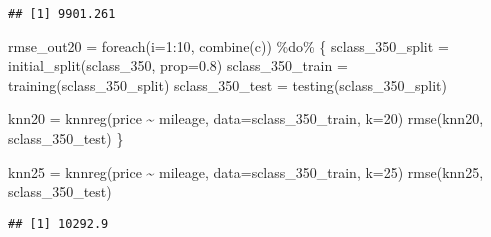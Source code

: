 \documentclass[
]{article}
\newenvironment{Shaded}{\begin{snugshade}}{\end{snugshade}}
\newcommand{\AttributeTok}[1]{\textcolor[rgb]{0.77,0.63,0.00}{#1}}
\newcommand{\DecValTok}[1]{\textcolor[rgb]{0.00,0.00,0.81}{#1}}
\newcommand{\FloatTok}[1]{\textcolor[rgb]{0.00,0.00,0.81}{#1}}
\newcommand{\FunctionTok}[1]{\textcolor[rgb]{0.00,0.00,0.00}{#1}}
\newcommand{\NormalTok}[1]{#1}
\newcommand{\OtherTok}[1]{\textcolor[rgb]{0.56,0.35,0.01}{#1}}
\newcommand{\SpecialCharTok}[1]{\textcolor[rgb]{0.00,0.00,0.00}{#1}}
\newcommand{\StringTok}[1]{\textcolor[rgb]{0.31,0.60,0.02}{#1}}
\begin{document}
\begin{verbatim}
## [1] 9901.261
\end{verbatim}

\begin{Shaded}
\begin{Highlighting}[]
\NormalTok{rmse\_out20 }\OtherTok{=} \FunctionTok{foreach}\NormalTok{(}\AttributeTok{i=}\DecValTok{1}\SpecialCharTok{:}\DecValTok{10}\NormalTok{, }\FunctionTok{combine}\NormalTok{(}\StringTok{\textquotesingle{}c\textquotesingle{}}\NormalTok{)) }\SpecialCharTok{\%do\%}\NormalTok{ \{}
\NormalTok{  sclass\_350\_split }\OtherTok{=} \FunctionTok{initial\_split}\NormalTok{(sclass\_350, }\AttributeTok{prop=}\FloatTok{0.8}\NormalTok{)}
\NormalTok{  sclass\_350\_train }\OtherTok{=} \FunctionTok{training}\NormalTok{(sclass\_350\_split)}
\NormalTok{  sclass\_350\_test }\OtherTok{=} \FunctionTok{testing}\NormalTok{(sclass\_350\_split)}
  
\NormalTok{  knn20 }\OtherTok{=} \FunctionTok{knnreg}\NormalTok{(price }\SpecialCharTok{\textasciitilde{}}\NormalTok{ mileage, }\AttributeTok{data=}\NormalTok{sclass\_350\_train, }\AttributeTok{k=}\DecValTok{20}\NormalTok{)}
  \FunctionTok{rmse}\NormalTok{(knn20, sclass\_350\_test)}
\NormalTok{\}}

\NormalTok{knn25 }\OtherTok{=} \FunctionTok{knnreg}\NormalTok{(price }\SpecialCharTok{\textasciitilde{}}\NormalTok{ mileage, }\AttributeTok{data=}\NormalTok{sclass\_350\_train, }\AttributeTok{k=}\DecValTok{25}\NormalTok{)}
\FunctionTok{rmse}\NormalTok{(knn25, sclass\_350\_test)}
\end{Highlighting}
\end{Shaded}

\begin{verbatim}
## [1] 10292.9
\end{verbatim}
\end{document}
